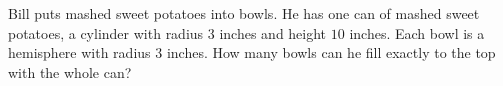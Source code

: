 Bill puts mashed sweet potatoes into bowls. He has one can of mashed sweet potatoes, a cylinder with radius $3$ inches and height $10$ inches. Each bowl is a hemisphere with radius $3$ inches. How many bowls can he fill exactly to the top with the whole can?
